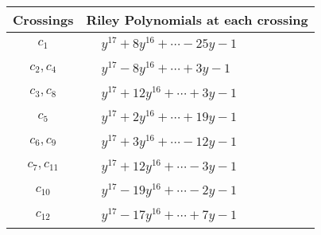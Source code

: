 \documentclass[1p]{elsarticle_modified}
\theoremstyle{definition}
\begin{document}
\begin{tabular}{m{50pt}|m{274pt}}
Crossings & \hspace{64pt}Riley Polynomials at each crossing \\
\hline $$\begin{aligned}c_{1}\end{aligned}$$&$\begin{aligned}
&y^{17}+8 y^{16}+\cdots-25 y-1
\end{aligned}$\\
\hline $$\begin{aligned}c_{2},c_{4}\end{aligned}$$&$\begin{aligned}
&y^{17}-8 y^{16}+\cdots+3 y-1
\end{aligned}$\\
\hline $$\begin{aligned}c_{3},c_{8}\end{aligned}$$&$\begin{aligned}
&y^{17}+12 y^{16}+\cdots+3 y-1
\end{aligned}$\\
\hline $$\begin{aligned}c_{5}\end{aligned}$$&$\begin{aligned}
&y^{17}+2 y^{16}+\cdots+19 y-1
\end{aligned}$\\
\hline $$\begin{aligned}c_{6},c_{9}\end{aligned}$$&$\begin{aligned}
&y^{17}+3 y^{16}+\cdots-12 y-1
\end{aligned}$\\
\hline $$\begin{aligned}c_{7},c_{11}\end{aligned}$$&$\begin{aligned}
&y^{17}+12 y^{16}+\cdots-3 y-1
\end{aligned}$\\
\hline $$\begin{aligned}c_{10}\end{aligned}$$&$\begin{aligned}
&y^{17}-19 y^{16}+\cdots-2 y-1
\end{aligned}$\\
\hline $$\begin{aligned}c_{12}\end{aligned}$$&$\begin{aligned}
&y^{17}-17 y^{16}+\cdots+7 y-1
\end{aligned}$\\
\hline
\end{tabular}\\~\\
\end{document}
